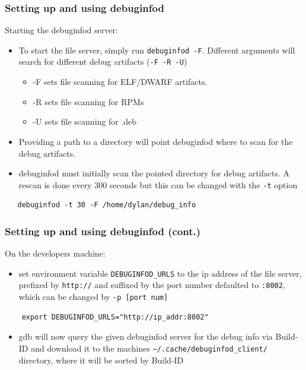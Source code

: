 \documentclass[12pt]{beamer}
\begin{document}
\begin{frame}[fragile]
   \fontsize{10pt}{10pt}{\selectfont}
   \frametitle{ Setting up and using debuginfod}
   Starting the debuginfod server:
   \begin{itemize}
      \item To start the file server, simply run \color{gray}\verb|debuginfod -F|\color{black}. 
         Different arguments will search for different debug artifacts (\verb|-F -R -U|)
         \begin{itemize}
            \item -F sets file scanning for ELF/DWARF artifacts.
            \item -R sets file scanning for RPMs
            \item -U sets file scanning for .deb
         \end{itemize}
      \item Providing a path to a directory will point debuginfod where to scan for the debug artifacts.
      \item debuginfod must initially scan the pointed directory for debug artifacts. 
         A rescan is done every 300 seconds but this can be changed with the
         \color{gray}\verb|-t| \color{black} option
   \end{itemize}
   \vspace{-.5cm}
   \color{gray}
   \begin{verbatim}
   debuginfod -t 30 -F /home/dylan/debug_info
   \end{verbatim}
\end{frame}

\begin{frame}[fragile]
   \fontsize{10pt}{10pt}\selectfont
   \frametitle{ Setting up and using debuginfod (cont.)}
   On the developers machine:
   \begin{itemize}
      \item set environment variable \color{gray}\verb|DEBUGINFOD_URLS|\color{black} to the ip address 
         of the file server, prefixed by \color{gray} \verb|http://| \color{black}and suffixed by the 
         port number defaulted to \color{gray} \verb|:8002|\color{black}, 
         which can be changed by \color{gray}\verb|-p [port num]|\color{black}
   \end{itemize}
   \color{gray}
   \begin{verbatim}
    export DEBUGINFOD_URLS="http://ip_addr:8002"
    \end{verbatim}
    \begin{itemize}
       \item gdb will now query the given debuginfod server for the debug info 
          via Build-ID and download it to the machines \color{gray}
          \verb|~/.cache/debuginfod_client/| \color{black}
          directory, where it will be sorted by Build-ID
    \end{itemize}
    


\end{frame}
\end{document}
